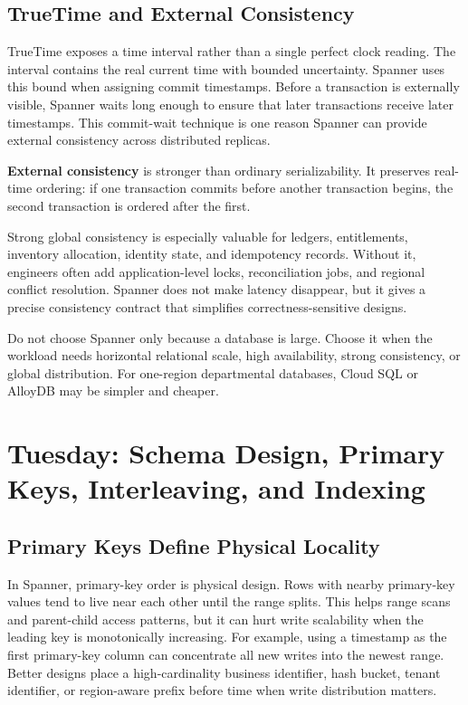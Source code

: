 \subsection{TrueTime and External Consistency}
TrueTime exposes a time interval rather than a single perfect clock reading. The interval contains the real current time with bounded uncertainty. Spanner uses this bound when assigning commit timestamps. Before a transaction is externally visible, Spanner waits long enough to ensure that later transactions receive later timestamps. This commit-wait technique is one reason Spanner can provide external consistency across distributed replicas.

\begin{definitionbox}
\textbf{External consistency} is stronger than ordinary serializability. It preserves real-time ordering: if one transaction commits before another transaction begins, the second transaction is ordered after the first.
\end{definitionbox}

Strong global consistency is especially valuable for ledgers, entitlements, inventory allocation, identity state, and idempotency records. Without it, engineers often add application-level locks, reconciliation jobs, and regional conflict resolution. Spanner does not make latency disappear, but it gives a precise consistency contract that simplifies correctness-sensitive designs.

\begin{pitfall}
Do not choose Spanner only because a database is large. Choose it when the workload needs horizontal relational scale, high availability, strong consistency, or global distribution. For one-region departmental databases, Cloud SQL or AlloyDB may be simpler and cheaper.
\end{pitfall}

\section{Tuesday: Schema Design, Primary Keys, Interleaving, and Indexing}

\subsection{Primary Keys Define Physical Locality}
In Spanner, primary-key order is physical design. Rows with nearby primary-key values tend to live near each other until the range splits. This helps range scans and parent-child access patterns, but it can hurt write scalability when the leading key is monotonically increasing. For example, using a timestamp as the first primary-key column can concentrate all new writes into the newest range. Better designs place a high-cardinality business identifier, hash bucket, tenant identifier, or region-aware prefix before time when write distribution matters.

